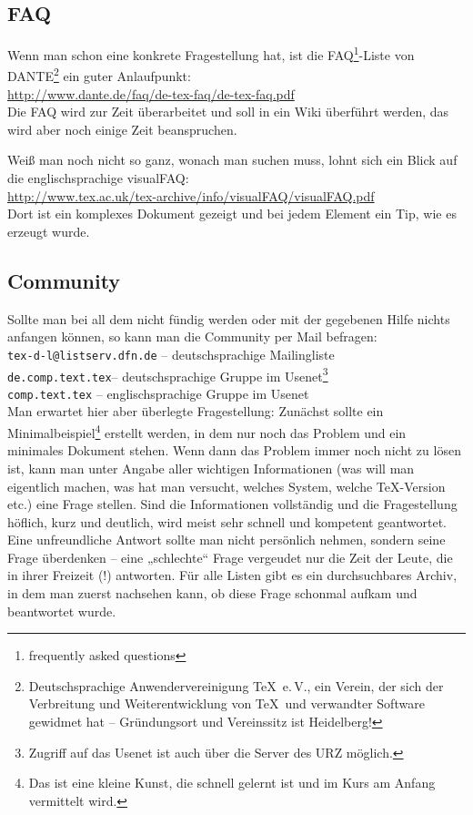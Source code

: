 \documentclass[12pt,ngerman]{scrartcl}
\begin{document}
\subsection{FAQ}
Wenn man schon eine konkrete Fragestellung hat, ist die FAQ\footnote{frequently asked questions}-Liste von DANTE\footnote{Deutschsprachige Anwendervereinigung \TeX\ e.\,V., ein Verein, der sich der Verbreitung und Weiterentwicklung von \TeX\ und verwandter Software gewidmet hat – Gründungsort und Vereinssitz ist Heidelberg!} ein guter Anlaufpunkt:\\
\url{http://www.dante.de/faq/de-tex-faq/de-tex-faq.pdf}\\
Die FAQ wird zur Zeit überarbeitet und soll in ein Wiki überführt werden, das wird aber noch einige Zeit beanspruchen.

Weiß man noch nicht so ganz, wonach man suchen muss, lohnt sich ein Blick auf die englischsprachige visualFAQ:\\
\url{http://www.tex.ac.uk/tex-archive/info/visualFAQ/visualFAQ.pdf}\\
Dort ist ein komplexes Dokument gezeigt und bei jedem Element ein Tip, wie es erzeugt wurde.

\subsection{Community}
Sollte man bei all dem nicht fündig werden oder mit der gegebenen Hilfe nichts anfangen können, so kann man die Community per Mail befragen:\\[.4ex]
\texttt{tex-d-l@listserv.dfn.de} – deutschsprachige Mailingliste \\
\texttt{de.comp.text.tex}– deutschsprachige Gruppe im Usenet\footnote{Zugriff auf das Usenet ist auch über die Server des URZ möglich.}\\
\texttt{comp.text.tex} – englischsprachige Gruppe im Usenet
\\[.4ex]
Man erwartet hier aber überlegte Fragestellung: Zunächst sollte ein Minimalbeispiel\footnote{Das ist eine kleine Kunst, die schnell gelernt ist und im Kurs am Anfang vermittelt wird.} erstellt werden, in dem nur noch das Problem und ein minimales Dokument stehen. Wenn dann das Problem immer noch nicht zu lösen ist, kann man unter Angabe aller wichtigen Informationen (was will man eigentlich machen, was hat man versucht, welches System, welche \TeX-Version etc.) eine Frage stellen. Sind die Informationen vollständig und die Fragestellung höflich, kurz und deutlich, wird meist sehr schnell und kompetent geantwortet. Eine unfreundliche Antwort sollte man nicht persönlich nehmen, sondern seine Frage überdenken – eine „schlechte“ Frage vergeudet nur die Zeit der Leute, die in ihrer Freizeit (!) antworten. Für alle Listen gibt es ein durchsuchbares Archiv, in dem man zuerst nachsehen kann, ob diese Frage schonmal aufkam und beantwortet wurde.
\end{document}
